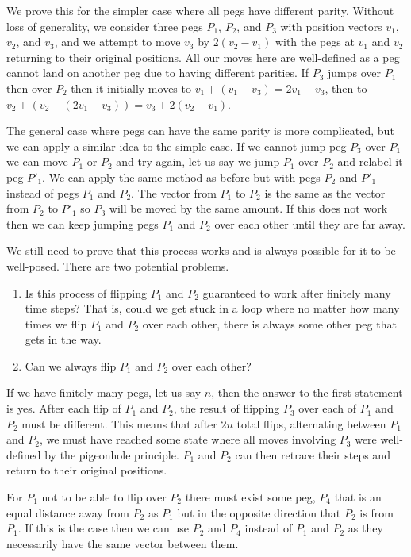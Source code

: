 \begin{parts}
\begin{solution}
		We prove this for the simpler case where all pegs have different parity. Without loss of generality, we consider three pegs $P_1$, $P_2$, and $P_3$ with position vectors $v_1$, $v_2$, and $v_3$, and we attempt to move $v_3$ by $2(v_2 - v_1)$ with the pegs at $v_1$ and $v_2$ returning to their original positions. All our moves here are well-defined as a peg cannot land on another peg due to having different parities. If $P_3$ jumps over $P_1$ then over $P_2$ then it initially moves to $v_1 + (v_1 - v_3) = 2v_1 - v_3$, then to $v_2 + (v_2 - (2v_1 - v_3)) = v_3 + 2(v_2 - v_1)$.
		
		The general case where pegs can have the same parity is more complicated, but we can apply a similar idea to the simple case. If we cannot jump peg $P_3$ over $P_1$ we can move $P_1$ or $P_2$ and try again, let us say we jump $P_1$ over $P_2$ and relabel it peg $P'_1$. We can apply the same method as before but with pegs $P_2$ and $P'_1$ instead of pegs $P_1$ and $P_2$. The vector from $P_1$ to $P_2$ is the same as the vector from $P_2$ to $P'_1$ so $P_3$ will be moved by the same amount. If this does not work then we can keep jumping pegs $P_1$ and $P_2$ over each other until they are far away.
		
		We still need to prove that this process works and is always possible for it to be well-posed. There are two potential problems.
		\begin{enumerate}
			\item Is this process of flipping $P_1$ and $P_2$ guaranteed to work after finitely many time steps? That is, could we get stuck in a loop where no matter how many times we flip $P_1$ and $P_2$ over each other, there is always some other peg that gets in the way.
			\item Can we always flip $P_1$ and $P_2$ over each other?
		\end{enumerate}
		
		If we have finitely many pegs, let us say $n$, then the answer to the first statement is yes. After each flip of $P_1$ and $P_2$, the result of flipping $P_3$ over each of $P_1$ and $P_2$ must be different. This means that after $2n$ total flips, alternating between $P_1$ and $P_2$, we must have reached some state where all moves involving $P_3$ were well-defined by the pigeonhole principle. $P_1$ and $P_2$ can then retrace their steps and return to their original positions.
		
		For $P_1$ not to be able to flip over $P_2$ there must exist some peg, $P_4$ that is an equal distance away from $P_2$ as $P_1$ but in the opposite direction that $P_2$ is from $P_1$. If this is the case then we can use $P_2$ and $P_4$ instead of $P_1$ and $P_2$ as they necessarily have the same vector between them.
		

\end{solution}
\end{parts}
